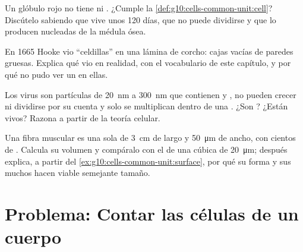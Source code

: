 \begin{exercise}[$\star\star\star$]\label{exo:g10:cells-common-unit:12}
Un glóbulo rojo no tiene  ni . ¿Cumple la
\cref{def:g10:cells-common-unit:cell}? Discútelo sabiendo que vive unos
120 días, que no puede dividirse y que lo producen  nucleadas de
la médula ósea.
\end{exercise}

\begin{exercise}[$\star\star\star$]\label{exo:g10:cells-common-unit:13}
En 1665 Hooke vio ``celdillas'' en una lámina de corcho: cajas vacías de
paredes gruesas. Explica qué vio en realidad, con el vocabulario de
este capítulo, y por qué no pudo ver un  en ellas.
\end{exercise}

\begin{exercise}[$\star\star\star$]\label{exo:g10:cells-common-unit:14}
Los virus son partículas de \qty{20}{nm} a \qty{300}{nm} que contienen
 y , no pueden crecer ni dividirse por su cuenta
y solo se multiplican dentro de una . ¿Son ? ¿Están vivos?
Razona a partir de la teoría celular.
\end{exercise}

\begin{exercise}[$\star\star\star$]\label{exo:g10:cells-common-unit:15}
Una fibra muscular es una sola  de \qty{3}{cm} de largo y
\qty{50}{\micro m} de ancho, con cientos de . Calcula su volumen
y compáralo con el de una  cúbica de \qty{20}{\micro m}; después
explica, a partir del \cref{ex:g10:cells-common-unit:surface}, por qué
su forma y sus muchos  hacen viable semejante tamaño.
\end{exercise}

\section{Problema: Contar las células de un cuerpo}

